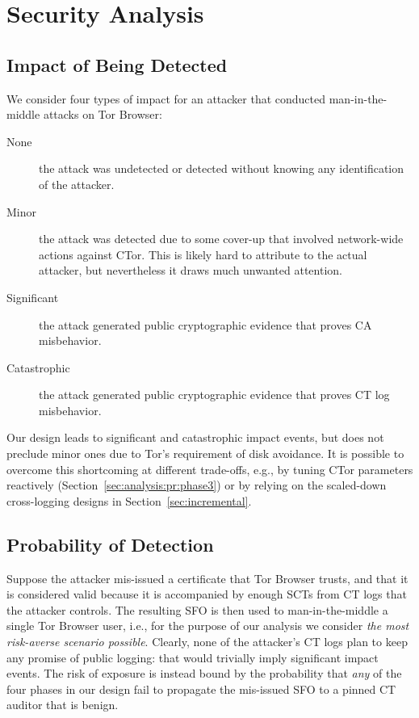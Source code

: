 \section{Security Analysis} \label{sec:analysis}

\subsection{Impact of Being Detected} \label{sec:analysis:impact}
We consider four types of impact for an attacker that conducted
man-in-the-middle attacks on Tor Browser:
\begin{description}
	\item[None] the attack was undetected or detected without knowing any
		identification of the attacker.
	\item[Minor] the attack was detected due to some cover-up that involved
		network-wide actions against CTor.  This is likely hard to attribute to
		the actual attacker, but nevertheless it draws much unwanted attention.
	\item[Significant] the attack generated public cryptographic evidence
		that proves CA misbehavior.
	\item[Catastrophic] the attack generated public cryptographic evidence
		that proves CT log misbehavior.
\end{description}

Our design leads to significant and catastrophic impact events, but does
not preclude minor ones due to Tor's requirement of disk avoidance.  It is
possible to overcome this shortcoming at different trade-offs, e.g., by
tuning CTor parameters reactively (Section~\ref{sec:analysis:pr:phase3}) or by
relying on the scaled-down cross-logging designs in
Section~\ref{sec:incremental}.

\subsection{Probability of Detection} \label{sec:analysis:pr}
Suppose the attacker mis-issued a certificate that Tor Browser trusts, and that
it is considered valid because it is accompanied by enough SCTs from CT logs
that the attacker controls.  The resulting SFO is then used to man-in-the-middle
a single Tor Browser user, i.e., for the purpose of our analysis we consider
\emph{the most risk-averse scenario possible}.  Clearly, none of the attacker's
CT logs plan to keep any promise of public logging:
	that would trivially imply significant impact events.
The risk of exposure is instead bound by the probability that \emph{any} of the
four phases in our design fail to propagate the mis-issued SFO to a pinned CT
auditor that is benign.

